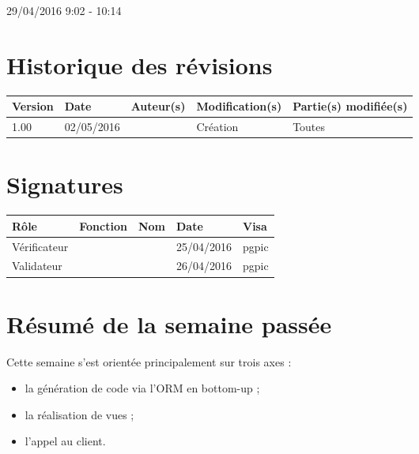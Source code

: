 \documentclass [a4paper] {article}
\begin{document}
29/04/2016			 				%
\hfill   
\hfill 	 9:02 - 10:14				%


\section*{Historique des révisions}
\begin{center}
			\begin{tabular}{| p{2.5cm} | p{3cm} | p{3cm} | p{3cm} | p{3.5cm} |}
				\hline
				\rowcolor{Gray}
				Version & Date & Auteur(s) & Modification(s) & Partie(s) modifiée(s)		 \\
				\hline
				1.00 & 02/05/2016 & \Pierre & Création & Toutes \\
		\hline		
			\end{tabular}
		\end{center}

\section*{Signatures}

		\begin{center}
			\begin{tabular}{| p{2.5cm} | p{4cm} | p{3cm} | p{3cm} | p{2.5cm} |}
				\hline
				\rowcolor{Gray}
				Rôle & Fonction & Nom & Date & Visa		 \\
				\hline
				Vérificateur & \RQA & \Kafui & 25/04/2016 & pgpic \\[30pt]
				\hline
				Validateur & \CP & \Sergi & 26/04/2016 & pgpic \\[30pt]	
				\hline
			\end{tabular}
		\end{center}


\section{Résumé de la semaine passée}
Cette semaine s'est orientée principalement sur trois axes : 
\begin{itemize}
\item la génération de code via l'ORM en bottom-up ;
\item la réalisation de vues ;
\item l'appel au client.
\end{itemize} 
\end{document}

